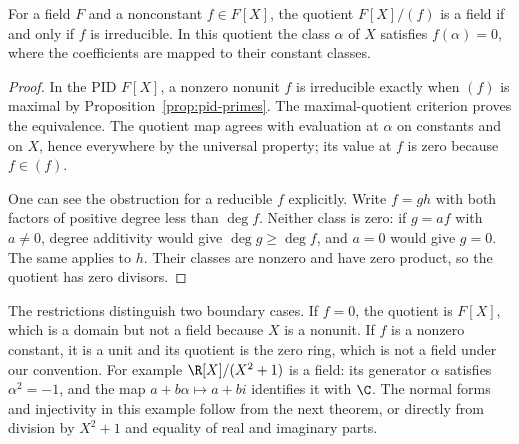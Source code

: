 \begin{theorem}\label{thm:irreducible-polynomial-quotient}
For a field $F$ and a nonconstant $f\in F[X]$, the quotient
$F[X]/(f)$ is a field if and only if $f$ is irreducible.
In this quotient the class $\alpha$ of $X$ satisfies $f(\alpha)=0$,
where the coefficients are mapped to their constant classes.
\end{theorem}
\begin{proof}
In the PID $F[X]$, a nonzero nonunit $f$ is irreducible exactly
when $(f)$ is maximal by Proposition~\ref{prop:pid-primes}.
The maximal-quotient criterion proves the equivalence.
The quotient map agrees with evaluation at $\alpha$ on constants
and on $X$, hence everywhere by the universal property; its value
at $f$ is zero because $f\in(f)$.

One can see the obstruction for a reducible $f$ explicitly.
Write $f=gh$ with both factors of positive degree less than $\deg f$.
Neither class is zero: if $g=af$ with $a\ne0$, degree additivity
would give $\deg g\ge\deg f$, and $a=0$ would give $g=0$.
The same applies to $h$. Their classes are nonzero and have zero
product, so the quotient has zero divisors.
\end{proof}
The restrictions distinguish two boundary cases. If $f=0$, the
quotient is $F[X]$, which is a domain but not a field because $X$
is a nonunit. If $f$ is a nonzero constant, it is a unit and its
quotient is the zero ring, which is not a field under our convention.
For example $\R[X]/(X^2+1)$ is a field: its generator $\alpha$
satisfies $\alpha^2=-1$, and the map $a+b\alpha\mapsto a+bi$
identifies it with $\C$. The normal forms and injectivity in this
example follow from the next theorem, or directly from division
by $X^2+1$ and equality of real and imaginary parts.

